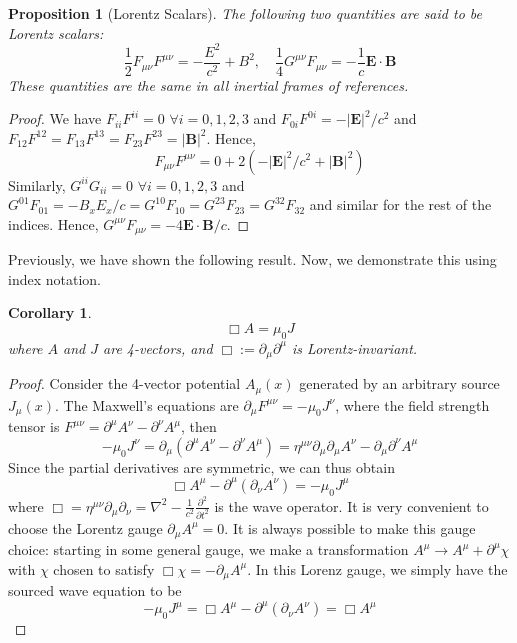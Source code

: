 \documentclass[a4paper]{article}
\theoremstyle{new}
\newtheorem{prop}{Proposition}[section]
\newtheorem{cor}{Corollary}[section]
\begin{document}
\begin{prop}[Lorentz Scalars]
The following two quantities are said to be Lorentz scalars:
$$\frac{1}{2}F_{\mu\nu}F^{\mu\nu}=-\frac{E^2}{c^2}+B^2,\quad\frac{1}{4}G^{\mu\nu}F_{\mu\nu}=-\frac{1}{c}\mathbf{E}\cdot\mathbf{B}$$
These quantities are the same in all inertial frames of references.
\end{prop}
\begin{proof}
We have $F_{ii}F^{ii}=0$ $\forall i=0,1,2,3$ and $F_{0i}F^{0i}=-|\mathbf{E}|^2/c^2$ and $F_{12}F^{12}=F_{13}F^{13}=F_{23}F^{23}=|\mathbf{B}|^2$. Hence,
$$F_{\mu\nu}F^{\mu\nu}=0+2(-|\mathbf{E}|^2/c^2+|\mathbf{B}|^2)$$
Similarly, $G^{ii}G_{ii}=0$ $\forall i=0,1,2,3$ and $G^{01}F_{01}=-B_xE_x/c=G^{10}F_{10}=G^{23}F_{23}=G^{32}F_{32}$ and similar for the rest of the indices. Hence, $G^{\mu\nu}F_{\mu\nu}=-4\mathbf{E}\cdot\mathbf{B}/c$.
\end{proof}
Previously, we have shown the following result. Now, we demonstrate this using index notation.
\begin{cor}
$$\Box A=\mu_0J$$
where $A$ and $J$ are 4-vectors, and $\Box:=\partial_\mu\partial^\mu$ is Lorentz-invariant.
\end{cor}
\begin{proof}
Consider the 4-vector potential $A_\mu(x)$ generated by an arbitrary source $J_\mu(x)$. The Maxwell's equations are $\partial_\mu F^{\mu\nu}=-\mu_0J^\nu$, where the field strength tensor is $F^{\mu\nu}=\partial^\mu A^\nu-\partial^\nu A^\mu$, then
$$-\mu_0J^\nu=\partial_\mu(\partial^\mu A^\nu-\partial^\nu A^\mu)=\eta^{\mu\nu}\partial_\mu\partial_\mu A^\nu-\partial_\mu\partial^\nu A^\mu$$
Since the partial derivatives are symmetric, we can thus obtain
$$\Box A^\mu-\partial^\mu(\partial_\nu A^\nu)=-\mu_0J^\mu$$
where $\Box=\eta^{\mu\nu}\partial_\mu\partial_\nu=\nabla^2-\frac{1}{c^2}\frac{\partial^2}{\partial t^2}$ is the wave operator. It is very convenient to choose the Lorentz gauge $\partial_\mu A^\mu=0$. It is always possible to make this gauge choice: starting in some general gauge, we make a transformation $A^\mu\rightarrow A^\mu+\partial^\mu\chi$ with $\chi$ chosen to satisfy $\Box\chi=-\partial_\mu A^\mu$. In this Lorenz gauge, we simply have the sourced wave equation to be
$$-\mu_0J^\mu=\Box A^\mu-\partial^\mu(\partial_\nu A^\nu)=\Box A^\mu$$
\end{proof}
\end{document}
